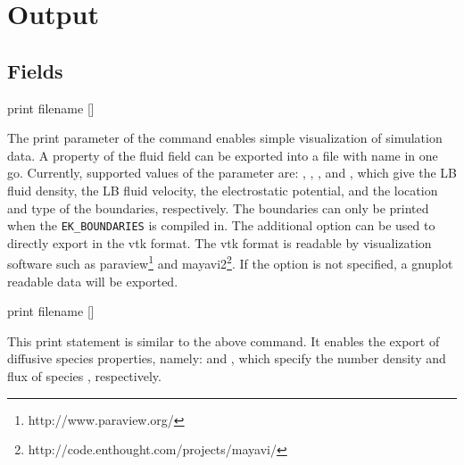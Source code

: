 \section{\label{ssec:ek-output}Output}

\subsection{\label{ssec:ek-output-fields}Fields}

\begin{essyntax}
  print 
  filename []
  \begin{features}
  \end{features}
\end{essyntax}
The print parameter of the  command enables simple 
visualization of simulation data. A property of the fluid field can be exported
into a file with name  in one go. Currently, supported values of
the parameter  are: , , 
, and , which give the LB fluid density, the LB 
fluid velocity, the electrostatic potential, and the location and type of the
boundaries, respectively. The boundaries can only be printed when the 
\texttt{EK_BOUNDARIES} is compiled in. The additional option  can be
used to directly export in the vtk format. The vtk format is readable
by visualization software such as paraview\footnote{http://www.paraview.org/}
and mayavi2\footnote{http://code.enthought.com/projects/mayavi/}. If the 
 option is not specified, a gnuplot readable data will be exported.

\begin{essyntax}
  print 
  filename []
  \begin{features}
  \end{features}
\end{essyntax}
This print statement is similar to the above command. It enables the export of
diffusive species properties, namely:  and , which 
specify the number density and flux of species ,
respectively.

